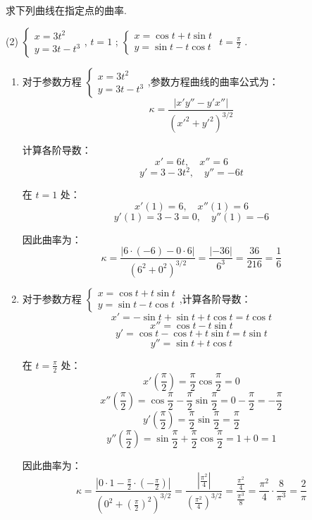 \begin{exercise}[3.5.12]
    求下列曲线在指定点的曲率.
    \begin{tasks}(2)
        \task $\begin{cases} x = 3t^2 \\ y = 3t - t^3 \end{cases}$,  $t = 1$ ;
        \task $\begin{cases} x = \cos t + t \sin t \\ y = \sin t - t \cos t \end{cases}$  $t = \frac{\pi}{2}$ .
    \end{tasks}
\end{exercise}

\begin{solution}
    \begin{enumerate}
        \item 对于参数方程 $\begin{cases} x = 3t^2 \\ y = 3t - t^3 \end{cases}$,参数方程曲线的曲率公式为：
              $$\kappa = \frac{|x'y'' - y'x''|}{(x'^2 + y'^2)^{3/2}}$$

              计算各阶导数：
              $$x' = 6t, \quad x'' = 6$$
              $$y' = 3 - 3t^2, \quad y'' = -6t$$

              在 $t = 1$ 处：
              $$x'(1) = 6, \quad x''(1) = 6$$
              $$y'(1) = 3 - 3 = 0, \quad y''(1) = -6$$

              因此曲率为：
              $$\kappa = \frac{|6 \cdot (-6) - 0 \cdot 6|}{(6^2 + 0^2)^{3/2}} = \frac{|-36|}{6^3} = \frac{36}{216} = \frac{1}{6}$$

        \item 对于参数方程 $\begin{cases} x = \cos t + t \sin t \\ y = \sin t - t \cos t \end{cases}$,计算各阶导数：
              $$x' = -\sin t + \sin t + t \cos t = t \cos t$$
              $$x'' = \cos t - t \sin t$$
              $$y' = \cos t - \cos t + t \sin t = t \sin t$$
              $$y'' = \sin t + t \cos t$$

              在 $t = \frac{\pi}{2}$ 处：
              $$x'\left(\frac{\pi}{2}\right) = \frac{\pi}{2} \cos\frac{\pi}{2} = 0$$
              $$x''\left(\frac{\pi}{2}\right) = \cos\frac{\pi}{2} - \frac{\pi}{2}\sin\frac{\pi}{2} = 0 - \frac{\pi}{2} = -\frac{\pi}{2}$$
              $$y'\left(\frac{\pi}{2}\right) = \frac{\pi}{2} \sin\frac{\pi}{2} = \frac{\pi}{2}$$
              $$y''\left(\frac{\pi}{2}\right) = \sin\frac{\pi}{2} + \frac{\pi}{2}\cos\frac{\pi}{2} = 1 + 0 = 1$$

              因此曲率为：
              $$\kappa = \frac{\left|0 \cdot 1 - \frac{\pi}{2} \cdot \left(-\frac{\pi}{2}\right)\right|}{\left(0^2 + \left(\frac{\pi}{2}\right)^2\right)^{3/2}} = \frac{\left|\frac{\pi^2}{4}\right|}{\left(\frac{\pi^2}{4}\right)^{3/2}} = \frac{\frac{\pi^2}{4}}{\frac{\pi^3}{8}} = \frac{\pi^2}{4} \cdot \frac{8}{\pi^3} = \frac{2}{\pi}$$
    \end{enumerate}
\end{solution}

